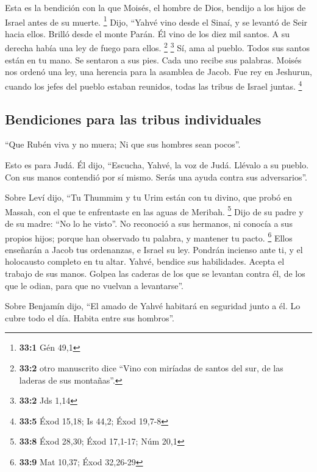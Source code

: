  Esta es la bendición con la que Moisés, el hombre de
Dios, bendijo a los hijos de Israel antes de su muerte. \footnote{\textbf{33:1}
  Gén 49,1}  Dijo, ``Yahvé vino desde el Sinaí, y se
levantó de Seir hacia ellos. Brilló desde el monte Parán. Él vino de los
diez mil santos. A su derecha había una ley de fuego para ellos.
\footnote{\textbf{33:2} otro manuscrito dice ``Vino con miríadas de
  santos del sur, de las laderas de sus montañas''.} \footnote{\textbf{33:2}
  Jds 1,14}  Sí, ama al pueblo. Todos sus santos están en
tu mano. Se sentaron a sus pies. Cada uno recibe sus palabras.
 Moisés nos ordenó una ley, una herencia para la asamblea
de Jacob.  Fue rey en Jeshurun, cuando los jefes del
pueblo estaban reunidos, todas las tribus de Israel juntas. \footnote{\textbf{33:5}
  Éxod 15,18; Is 44,2; Éxod 19,7-8}

\hypertarget{bendiciones-para-las-tribus-individuales}{%
\subsection{Bendiciones para las tribus
individuales}\label{bendiciones-para-las-tribus-individuales}}

 ``Que Rubén viva y no muera; Ni que sus hombres sean
pocos''.

 Esto es para Judá. Él dijo, ``Escucha, Yahvé, la voz de
Judá. Llévalo a su pueblo. Con sus manos contendió por sí mismo. Serás
una ayuda contra sus adversarios''.

 Sobre Leví dijo, ``Tu Thummim y tu Urim están con tu
divino, que probó en Massah, con el que te enfrentaste en las aguas de
Meribah. \footnote{\textbf{33:8} Éxod 28,30; Éxod 17,1-17; Núm 20,1}
 Dijo de su padre y de su madre: ``No lo he visto''. No
reconoció a sus hermanos, ni conocía a sus propios hijos; porque han
observado tu palabra, y mantener tu pacto. \footnote{\textbf{33:9} Mat
  10,37; Éxod 32,26-29}  Ellos enseñarán a Jacob tus
ordenanzas, e Israel su ley. Pondrán incienso ante ti, y el holocausto
completo en tu altar.  Yahvé, bendice sus habilidades.
Acepta el trabajo de sus manos. Golpea las caderas de los que se
levantan contra él, de los que le odian, para que no vuelvan a
levantarse''.

 Sobre Benjamín dijo, ``El amado de Yahvé habitará en
seguridad junto a él. Lo cubre todo el día. Habita entre sus hombros''.

